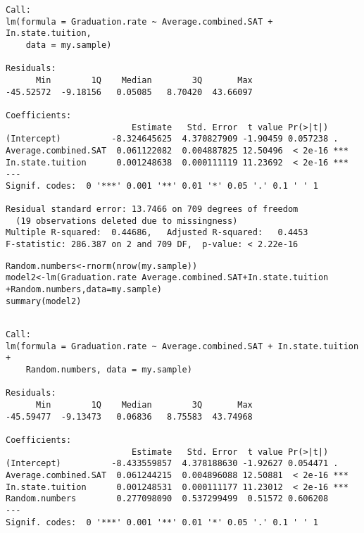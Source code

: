 \documentclass{beamer}\usepackage[]{graphicx}\usepackage[]{color}
\makeatletter
\newcommand{\hlopt}[1]{\textcolor[rgb]{1,0.894,0.769}{#1}}%
\newcommand{\hlstd}[1]{\textcolor[rgb]{1,0.894,0.769}{#1}}%
\newcommand{\hlkwb}[1]{\textcolor[rgb]{0.804,0.776,0.451}{#1}}%
\newcommand{\hlkwc}[1]{\textcolor[rgb]{0.78,0.941,0.545}{#1}}%
\newcommand{\hlkwd}[1]{\textcolor[rgb]{1,0.78,0.769}{#1}}%
\newenvironment{kframe}{%
 \def\at@end@of@kframe{}%
 \ifinner\ifhmode%
  \def\at@end@of@kframe{\end{minipage}}%
  \begin{minipage}{\columnwidth}%
 \fi\fi%
 \def\FrameCommand##1{\hskip\@totalleftmargin \hskip-\fboxsep
 \colorbox{shadecolor}{##1}\hskip-\fboxsep
     \hskip-\linewidth \hskip-\@totalleftmargin \hskip\columnwidth}%
 \MakeFramed {\advance\hsize-\width
   \@totalleftmargin\z@ \linewidth\hsize
   \@setminipage}}%
 {\par\unskip\endMakeFramed%
 \at@end@of@kframe}
\newenvironment{knitrout}{}{} %
\makeatother
\begin{document}
\begin{darkframes}
\begin{frame}[fragile]
\begin{knitrout}
\begin{kframe}
\begin{verbatim}
Call:
lm(formula = Graduation.rate ~ Average.combined.SAT + In.state.tuition, 
    data = my.sample)

Residuals:
      Min        1Q    Median        3Q       Max 
-45.52572  -9.18156   0.05085   8.70420  43.66097 

Coefficients:
                         Estimate   Std. Error  t value Pr(>|t|)    
(Intercept)          -8.324645625  4.370827909 -1.90459 0.057238 .  
Average.combined.SAT  0.061122082  0.004887825 12.50496  < 2e-16 ***
In.state.tuition      0.001248638  0.000111119 11.23692  < 2e-16 ***
---
Signif. codes:  0 '***' 0.001 '**' 0.01 '*' 0.05 '.' 0.1 ' ' 1

Residual standard error: 13.7466 on 709 degrees of freedom
  (19 observations deleted due to missingness)
Multiple R-squared:  0.44686,	Adjusted R-squared:   0.4453 
F-statistic: 286.387 on 2 and 709 DF,  p-value: < 2.22e-16
\end{verbatim}
\end{kframe}
\end{knitrout}
    \end{frame}

    \begin{frame}[fragile]
      \fontsize{8}{8}
\begin{knitrout}
\color{fgcolor}\begin{kframe}
\begin{alltt}
\hlstd{Random.numbers} \hlkwb{<-} \hlkwd{rnorm}\hlstd{(}\hlkwd{nrow}\hlstd{(my.sample))}
\hlstd{model2} \hlkwb{<-} \hlkwd{lm}\hlstd{(Graduation.rate} \hlopt{~} \hlstd{Average.combined.SAT} \hlopt{+} \hlstd{In.state.tuition}
               \hlopt{+} \hlstd{Random.numbers,} \hlkwc{data}\hlstd{=my.sample)}
\hlkwd{summary}\hlstd{(model2)}
\end{alltt}
\begin{verbatim}

Call:
lm(formula = Graduation.rate ~ Average.combined.SAT + In.state.tuition + 
    Random.numbers, data = my.sample)

Residuals:
      Min        1Q    Median        3Q       Max 
-45.59477  -9.13473   0.06836   8.75583  43.74968 

Coefficients:
                         Estimate   Std. Error  t value Pr(>|t|)    
(Intercept)          -8.433559857  4.378188630 -1.92627 0.054471 .  
Average.combined.SAT  0.061244215  0.004896088 12.50881  < 2e-16 ***
In.state.tuition      0.001248531  0.000111177 11.23012  < 2e-16 ***
Random.numbers        0.277098090  0.537299499  0.51572 0.606208    
---
Signif. codes:  0 '***' 0.001 '**' 0.01 '*' 0.05 '.' 0.1 ' ' 1


\end{verbatim}
\end{kframe}
\end{knitrout}
\end{frame}
\end{darkframes}
\end{document}
